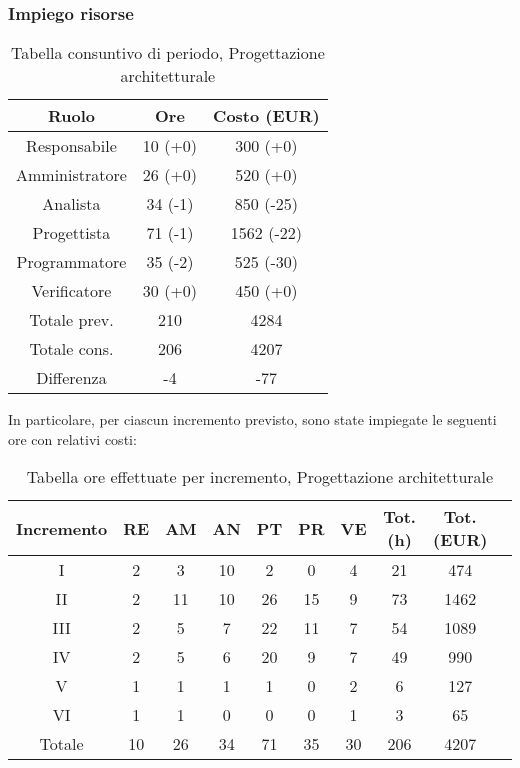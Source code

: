 \subsubsection{Impiego risorse}
\begin{table}[h]
\caption{Tabella consuntivo di periodo, Progettazione architetturale}  
\begin{center}
\begin{tabular}{ |c|c|c|  }
 \hline
 Ruolo 		& Ore & Costo (EUR)\\
 \hline\hline
	Responsabile	& 10 (+0) & 300 (+0)\\
	Amministratore	& 26 (+0) & 520 (+0)\\
	Analista		& 34 (-1) & 850 (-25)\\
	Progettista		& 71 (-1) & 1562 (-22)\\
	Programmatore	& 35 (-2) & 525 (-30)\\
	Verificatore	& 30 (+0) & 450 (+0)\\
	\hline\hline
	Totale prev.	& 210 & 4284 \\
	Totale cons.	& 206 & 4207 \\
	Differenza		& -4 & -77 \\
 \hline
\end{tabular}
\end{center}
\end{table}
\newpage
\noindent In particolare, per ciascun incremento previsto, sono state impiegate le seguenti ore con relativi costi:
\begin{table}[h]
	\caption{Tabella ore effettuate per incremento, Progettazione architetturale}  
	\begin{center}
		\begin{tabular}{ |c|c|c|c|c|c|c|c|c|c| }
			\hline
			Incremento 		& RE 	& AM 	& AN 	& PT 	& PR 	& VE 	& Tot. (h)		&Tot.(EUR)\\
			\hline\hline
			I		& 2 		& 3			& 10 	& 2 	& 0 		& 4 		& 21 	&474\\
			II		& 2 		& 11 		& 10 	& 26	& 15 		& 9 		& 73 	&1462\\
			III		& 2 		& 5 		& 7 	& 22	& 11 		& 7 		& 54 	&1089\\
			IV		& 2 		& 5 		& 6 	& 20 	& 9 		& 7 		& 49 	&990\\
			V		& 1 		& 1 		& 1 	& 1		& 0 		& 2	 		& 6 	&127\\
			VI		& 1 		& 1 		& 0 	& 0 	& 0 		& 1 		& 3 	&65\\
			\hline\hline
			Totale		& 10		& 26		& 34 	& 71	 	& 35 	& 30 	& 206		&4207\\
			\hline
		\end{tabular}
	\end{center}
\end{table}

